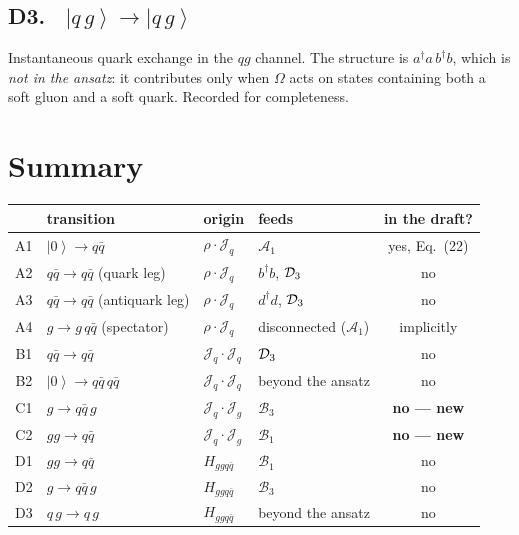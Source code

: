 \documentclass[11pt]{article}
\newcommand{\ibarh}[2]{\draw[line width=1.1pt] (#1,#2-0.13) -- (#1,#2+0.13);}
\newcommand{\dg}{\dagger}
\newcommand{\ket}[1]{\left|#1\right\rangle}
\newcommand{\vac}{\ket{0}}
\newcommand{\A}{\mathcal{A}}\newcommand{\B}{\mathcal{B}}
\newcommand{\Jc}{\mathcal{J}}
\begin{document}
\subsection*{D3. \ $\ket{q\,g}\to\ket{q\,g}$}
\begin{center}
\end{center}
Instantaneous quark exchange in the $q g$ channel. The structure is $a^{\dg}a\,b^{\dg}b$, which is
\emph{not in the ansatz}: it contributes only when $\Omega$ acts on states containing both a soft
gluon and a soft quark. Recorded for completeness.

\section{Summary}

\begin{center}
\renewcommand{\arraystretch}{1.3}
\begin{tabular}{clllc}
\hline
& transition & origin & feeds & in the draft?\\
\hline
A1 & $\vac\to q\bar q$ & $\rho\!\cdot\!\Jc_{q}$ & $\A_{1}$ & yes, Eq.~(22)\\
A2 & $q\bar q\to q\bar q$ (quark leg) & $\rho\!\cdot\!\Jc_{q}$ & $b^{\dg}b$, $\mathcal{D}_{3}$ & no\\
A3 & $q\bar q\to q\bar q$ (antiquark leg) & $\rho\!\cdot\!\Jc_{q}$ & $d^{\dg}d$, $\mathcal{D}_{3}$ & no\\
A4 & $g\to g\,q\bar q$ (spectator) & $\rho\!\cdot\!\Jc_{q}$ & disconnected ($\A_{1}$) & implicitly\\
B1 & $q\bar q\to q\bar q$ & $\Jc_{q}\!\cdot\!\Jc_{q}$ & $\mathcal{D}_{3}$ & no\\
B2 & $\vac\to q\bar q\,q\bar q$ & $\Jc_{q}\!\cdot\!\Jc_{q}$ & beyond the ansatz & no\\
C1 & $g\to q\bar q\,g$ & $\Jc_{q}\!\cdot\!\Jc_{g}$ & $\B_{3}$ & \textbf{no --- new}\\
C2 & $gg\to q\bar q$ & $\Jc_{q}\!\cdot\!\Jc_{g}$ & $\B_{1}$ & \textbf{no --- new}\\
D1 & $gg\to q\bar q$ & $H_{ggq\bar q}$ & $\B_{1}$ & no\\
D2 & $g\to q\bar q\,g$ & $H_{ggq\bar q}$ & $\B_{3}$ & no\\
D3 & $q\,g\to q\,g$ & $H_{ggq\bar q}$ & beyond the ansatz & no\\
\hline
\end{tabular}
\end{center}
\end{document}
